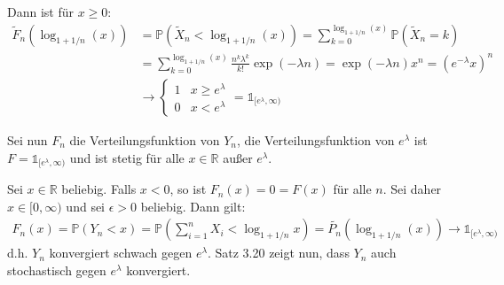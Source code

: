\documentclass[a4paper]{article}
\begin{document}
\begin{enumerate}
    Dann ist für $x \geq 0$:
    \begin{align*}
        \tilde{F}_n(\log_{1 + 1/n}(x)) &= \mathds{P}(\tilde{X}_n < \log_{1 + 1/n}(x)) = \sum_{k = 0}^{\log_{1 + 1/n}(x)} \mathds{P}(\tilde{X}_n = k) \\
        &= \sum_{k = 0}^{\log_{1 + 1/n}(x)} \frac{n^k \lambda^k}{k!} \exp(- \lambda n) = \exp(- \lambda n) x^n = \left( e^{-\lambda} x \right)^n \\
        &\to \left\{ \begin{matrix}
            1 & x \geq e^\lambda \\ 0 & x < e^\lambda 
        \end{matrix}\right. = \mathds{1}_{[e^\lambda, \infty)}
    \end{align*}

    Sei nun $F_n$ die Verteilungsfunktion von $Y_n$, die Verteilungsfunktion von $e^\lambda$ ist $F = \mathds{1}_{[e^\lambda, \infty)}$ und ist stetig für alle $x \in \mathds{R}$ außer $e^\lambda$.

    Sei $x \in \mathds{R}$ beliebig.
    Falls $x < 0$, so ist $F_n(x) = 0 = F(x)$ für alle $n$.
    Sei daher $x \in [0, \infty)$ und sei $\epsilon > 0$ beliebig.
    Dann gilt:
    \begin{align*}
        F_n(x) = \mathds{P}(Y_n < x) = \mathds{P}\left(\sum_{i = 1}^{n} X_i < \log_{1+1/n} x\right) = \tilde{P_n}(\log_{1 + 1/n}(x)) \to \mathds{1}_{[e^\lambda, \infty)}
    \end{align*}
    d.h. $Y_n$ konvergiert schwach gegen $e^\lambda$.
    Satz 3.20 zeigt nun, dass $Y_n$ auch stochastisch gegen $e^\lambda$ konvergiert.
\end{enumerate}
\end{document}

